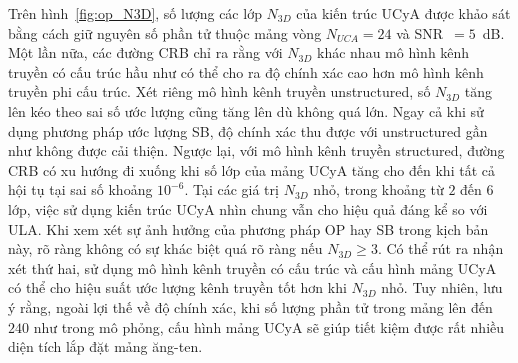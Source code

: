 Trên hình~\ref{fig:op_N3D}, số lượng các lớp $N_{3D}$ của kiến trúc UCyA được khảo sát bằng cách giữ nguyên số phần tử thuộc mảng vòng $N_{UCA} = 24$ và SNR~$=5$~dB. Một lần nữa, các đường CRB chỉ ra rằng với $N_{3D}$ khác nhau mô hình kênh truyền có cấu trúc hầu như có thể cho ra độ chính xác cao hơn mô hình kênh truyền phi cấu trúc. Xét riêng mô hình kênh truyền unstructured, số $N_{3D}$ tăng lên kéo theo sai số ước lượng cũng tăng lên dù không quá lớn. Ngay cả khi sử dụng phương pháp ước lượng SB, độ chính xác thu được với unstructured gần như không được cải thiện. Ngược lại, với mô hình kênh truyền structured, đường CRB có xu hướng đi xuống khi số lớp của mảng UCyA tăng cho đến khi tất cả hội tụ tại sai số khoảng $10^{-6}$. Tại các giá trị $N_{3D}$ nhỏ, trong khoảng từ $2$ đến $6$ lớp, việc sử dụng kiến trúc UCyA nhìn chung vẫn cho hiệu quả đáng kể so với ULA. Khi xem xét sự ảnh hưởng của phương pháp OP hay SB trong kịch bản này, rõ ràng không có sự khác biệt quá rõ ràng nếu $N_{3D} \ge 3$. Có thể rút ra nhận xét thứ hai, sử dụng mô hình kênh truyền có cấu trúc và cấu hình mảng UCyA có thể cho hiệu suất ước lượng kênh truyền tốt hơn khi $N_{3D}$ nhỏ. Tuy nhiên, lưu ý rằng, ngoài lợi thế về độ chính xác, khi số lượng phần tử trong mảng lên đến $240$ như trong mô phỏng, cấu hình mảng UCyA sẽ giúp tiết kiệm được rất nhiều diện tích lắp đặt mảng ăng-ten.

